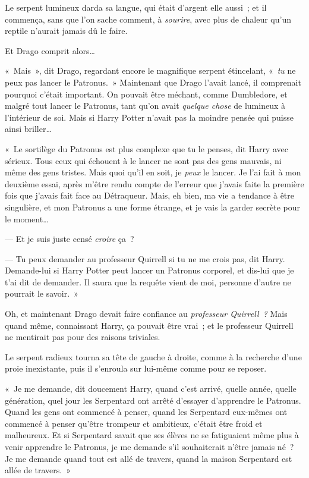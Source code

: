 Le serpent lumineux darda sa langue, qui était d'argent elle aussi~; et il commença, sans que l'on sache comment, à \emph{sourire}, avec plus de chaleur qu'un reptile n'aurait jamais dû le faire.

Et Drago comprit alors…

«~Mais~», dit Drago, regardant encore le magnifique serpent étincelant, «~\emph{tu} ne peux pas lancer le Patronus.~»
Maintenant que Drago l'avait lancé, il comprenait pourquoi c'était important.
On pouvait être méchant, comme Dumbledore, et malgré tout lancer le Patronus, tant qu'on avait \emph{quelque chose} de lumineux à l'intérieur de soi.
Mais si Harry Potter n'avait pas la moindre pensée qui puisse ainsi briller…

«~Le sortilège du Patronus est plus complexe que tu le penses, dit Harry avec sérieux.
Tous ceux qui échouent à le lancer ne sont pas des gens mauvais, ni même des gens tristes.
Mais quoi qu'il en soit, je \emph{peux} le lancer.
Je l'ai fait à mon deuxième essai, après m'être rendu compte de l'erreur que j'avais faite la première fois que j'avais fait face au Détraqueur.
Mais, eh bien, ma vie a tendance à être singulière, et mon Patronus a une forme étrange, et je vais la garder secrète pour le moment…

--- Et je suis juste censé \emph{croire} ça~?

--- Tu peux demander au professeur Quirrell si tu ne me crois pas, dit Harry.
Demande-lui si Harry Potter peut lancer un Patronus corporel, et dis-lui que je t'ai dit de demander.
Il saura que la requête vient de moi, personne d'autre ne pourrait le savoir.~»

Oh, et maintenant Drago devait faire confiance au \emph{professeur Quirrell~?} Mais quand même, connaissant Harry, ça pouvait être vrai~; et le professeur Quirrell ne mentirait pas pour des raisons triviales.

Le serpent radieux tourna sa tête de gauche à droite, comme à la recherche d'une proie inexistante, puis il s'enroula sur lui-même comme pour se reposer.

«~Je me demande, dit doucement Harry, quand c'est arrivé, quelle année, quelle génération, quel jour les Serpentard ont arrêté d'essayer d'apprendre le Patronus.
Quand les gens ont commencé à penser, quand les Serpentard eux-mêmes ont commencé à penser qu'être trompeur et ambitieux, c'était être froid et malheureux.
Et si Serpentard savait que ses élèves ne se fatiguaient même plus à venir apprendre le Patronus, je me demande s'il souhaiterait n'être jamais né~?
Je me demande quand tout est allé de travers, quand la maison Serpentard est allée de travers.~»

